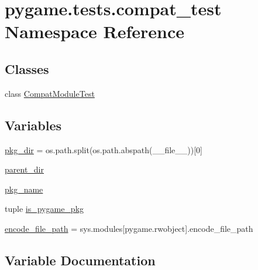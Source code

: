 \hypertarget{namespacepygame_1_1tests_1_1compat__test}{}\section{pygame.\+tests.\+compat\+\_\+test Namespace Reference}
\label{namespacepygame_1_1tests_1_1compat__test}
\subsection*{Classes}
\begin{DoxyCompactItemize}
\item 
class \hyperlink{classpygame_1_1tests_1_1compat__test_1_1_compat_module_test}{Compat\+Module\+Test}
\end{DoxyCompactItemize}
\subsection*{Variables}
\begin{DoxyCompactItemize}
\item 
\hyperlink{namespacepygame_1_1tests_1_1compat__test_ab37d8be38d9427bf1e0fe179bb9856be}{pkg\+\_\+dir} = os.\+path.\+split(os.\+path.\+abspath(\+\_\+\+\_\+file\+\_\+\+\_\+))\mbox{[}0\mbox{]}
\item 
\hyperlink{namespacepygame_1_1tests_1_1compat__test_a402786aca3a15bd94817184ee85d7856}{parent\+\_\+dir}
\item 
\hyperlink{namespacepygame_1_1tests_1_1compat__test_aee0e732a1334d34830af88149d03fa1d}{pkg\+\_\+name}
\item 
tuple \hyperlink{namespacepygame_1_1tests_1_1compat__test_abbbf88d1e6a335373c0bd55676183512}{is\+\_\+pygame\+\_\+pkg}
\item 
\hyperlink{namespacepygame_1_1tests_1_1compat__test_a3d0ed62a43a879903d775c8a8d8e6f4a}{encode\+\_\+file\+\_\+path} = sys.\+modules\mbox{[}\textquotesingle{}pygame.\+rwobject\textquotesingle{}\mbox{]}.encode\+\_\+file\+\_\+path
\end{DoxyCompactItemize}


\subsection{Variable Documentation}
\mbox{\label{namespacepygame_1_1tests_1_1compat__test_a3d0ed62a43a879903d775c8a8d8e6f4a}} 
